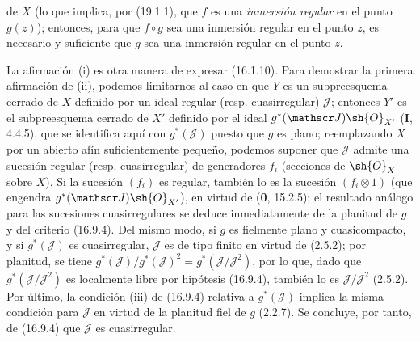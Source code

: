 \begin{proposition}[19.1.5]
\begin{enumerate}

de $X$ \textup{(lo que implica, por (19.1.1), que $f$ es una \emph{inmersión regular} en el punto $g(z)$)}; entonces, para que $f\circ g$ sea una inmersión regular en el punto $z$, es necesario y suficiente que $g$ sea una inmersión regular en el punto $z$.
\end{enumerate}
\end{proposition}

La afirmación (i) es otra manera de expresar (16.1.10). Para demostrar la primera afirmación de (ii), podemos limitarnos al caso en que $Y$ es un subpreesquema cerrado de $X$ definido por un ideal regular (resp. cuasirregular) $\mathscr J$; entonces $Y'$ es el subpreesquema cerrado de $X'$ definido por el ideal $g^*(\mathscr J)\sh{O}_{X'}$ (\textbf I, 4.4.5), que se identifica aquí con $g^*(\mathscr J)$ puesto que $g$ es plano; reemplazando $X$ por un abierto afín suficientemente pequeño, podemos suponer que $\mathscr J$ admite una sucesión regular (resp. cuasirregular) de generadores $f_i$ (secciones de $\sh{O}_X$ sobre $X$). Si la sucesión $(f_i)$ es regular, también lo es la sucesión $(f_i\otimes1)$ (que engendra $g^*(\mathscr J)\sh{O}_{X'}$), en virtud de (\textbf{0}, 15.2.5); el resultado análogo para las sucesiones cuasirregulares se deduce inmediatamente de la planitud de $g$ y del criterio (16.9.4). Del mismo modo, si $g$ es fielmente plano y cuasicompacto, y si $g^*(\mathscr J)$ es cuasirregular, $\mathscr J$ es de tipo finito en virtud de (2.5.2); por planitud, se tiene $g^*(\mathscr J)/g^*(\mathscr J)^2=g^*(\mathscr J/\mathscr J^2)$, por lo que, dado que $g^*(\mathscr J/\mathscr J^2)$ es localmente libre por hipótesis (16.9.4), también lo es $\mathscr J/\mathscr J^2$ (2.5.2). Por último, la condición (iii) de (16.9.4) relativa a $g^*(\mathscr J)$ implica la misma condición para $\mathscr J$ en virtud de la planitud fiel de $g$ (2.2.7). Se concluye, por tanto, de (16.9.4) que $\mathscr J$ es cuasirregular.

